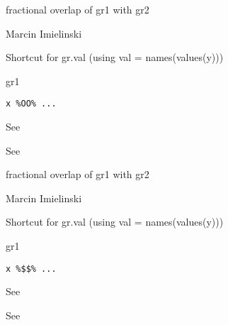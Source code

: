 \documentclass[a4paper]{book}
\begin{document}
%
\begin{Value}
fractional overlap of gr1 with gr2
\end{Value}
%
\begin{Author}\relax
Marcin Imielinski
\end{Author}
%
\begin{Description}\relax
Shortcut for gr.val (using val = names(values(y)))

gr1 
\end{Description}
%
\begin{Usage}
\begin{verbatim}
x %OO% ...
\end{verbatim}
\end{Usage}
%
\begin{Arguments}
\begin{ldescription}
\item[\code{x}] See 

\item[\code{...}] See 
\end{ldescription}
\end{Arguments}
%
\begin{Value}
fractional overlap  of gr1 with gr2
\end{Value}
%
\begin{Author}\relax
Marcin Imielinski
\end{Author}
%
\begin{Description}\relax
Shortcut for gr.val (using val = names(values(y)))

gr1 
\end{Description}
%
\begin{Usage}
\begin{verbatim}
x %$$% ...
\end{verbatim}
\end{Usage}
%
\begin{Arguments}
\begin{ldescription}
\item[\code{x}] See 

\item[\code{...}] See 
\end{ldescription}
\end{Arguments}
\end{document}
